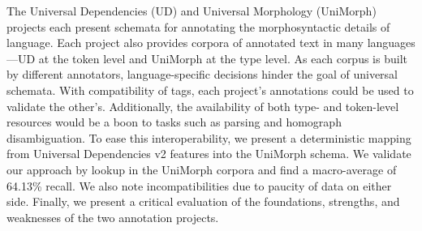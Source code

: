 The Universal Dependencies (UD) and Universal Morphology (UniMorph) projects each present schemata for annotating the morphosyntactic details of language. Each project also provides corpora of annotated text in many languages—UD at the token level and UniMorph at the type level. As each corpus is built by different annotators, language-specific decisions hinder the goal of universal schemata. With compatibility of tags, each project's annotations could be used to validate the other's. Additionally, the availability of both type- and token-level resources would be a boon to tasks such as parsing and homograph disambiguation. To ease this interoperability, we present a deterministic mapping from Universal Dependencies v2 features into the UniMorph schema. We validate our approach by lookup in the UniMorph corpora and find a macro-average of 64.13\% recall. We also note incompatibilities due to paucity of data on either side. Finally, we present a critical evaluation of the foundations, strengths, and weaknesses of the two annotation projects.
